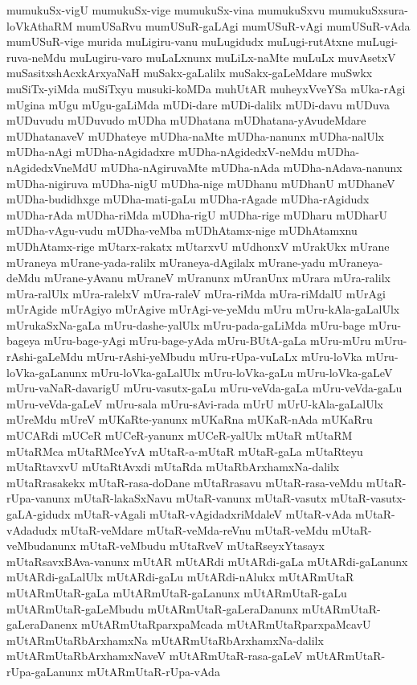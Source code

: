 {mumukuSx-vigU
mumukuSx-vige
mumukuSx-vina
mumukuSxvu
mumukuSxsura-loVkAthaRM
mumUSaRvu
mumUSuR-gaLAgi
mumUSuR-vAgi
mumUSuR-vAda
mumUSuR-vige
murida
muLigiru-vanu
muLugidudx
muLugi-rutAtxne
muLugi-ruva-neMdu
muLugiru-varo
muLaLxnunx
muLiLx-naMte
muLuLx
muvAsetxV
muSasitxshAcxkArxyaNaH
muSakx-gaLalilx
muSakx-gaLeMdare
muSwkx
muSiTx-yiMda
muSiTxyu
musuki-koMDa
muhUtAR
muheyxVveYSa
mUka-rAgi
mUgina
mUgu
mUgu-gaLiMda
mUDi-dare
mUDi-dalilx
mUDi-davu
mUDuva
mUDuvudu
mUDuvudo
mUDha
mUDhatana
mUDhatana-yAvudeMdare
mUDhatanaveV
mUDhateye
mUDha-naMte
mUDha-nanunx
mUDha-nalUlx
mUDha-nAgi
mUDha-nAgidadxre
mUDha-nAgidedxV-neMdu
mUDha-nAgidedxVneMdU
mUDha-nAgiruvaMte
mUDha-nAda
mUDha-nAdava-nanunx
mUDha-nigiruva
mUDha-nigU
mUDha-nige
mUDhanu
mUDhanU
mUDhaneV
mUDha-budidhxge
mUDha-mati-gaLu
mUDha-rAgade
mUDha-rAgidudx
mUDha-rAda
mUDha-riMda
mUDha-rigU
mUDha-rige
mUDharu
mUDharU
mUDha-vAgu-vudu
mUDha-veMba
mUDhAtamx-nige
mUDhAtamxnu
mUDhAtamx-rige
mUtarx-rakatx
mUtarxvU
mUdhonxV
mUrakUkx
mUrane
mUraneya
mUrane-yada-ralilx
mUraneya-dAgilalx
mUrane-yadu
mUraneya-deMdu
mUrane-yAvanu
mUraneV
mUranunx
mUranUnx
mUrara
mUra-ralilx
mUra-ralUlx
mUra-ralelxV
mUra-raleV
mUra-riMda
mUra-riMdalU
mUrAgi
mUrAgide
mUrAgiyo
mUrAgive
mUrAgi-ve-yeMdu
mUru
mUru-kAla-gaLalUlx
mUrukaSxNa-gaLa
mUru-dashe-yalUlx
mUru-pada-gaLiMda
mUru-bage
mUru-bageya
mUru-bage-yAgi
mUru-bage-yAda
mUru-BUtA-gaLa
mUru-mUru
mUru-rAshi-gaLeMdu
mUru-rAshi-yeMbudu
mUru-rUpa-vuLaLx
mUru-loVka
mUru-loVka-gaLanunx
mUru-loVka-gaLalUlx
mUru-loVka-gaLu
mUru-loVka-gaLeV
mUru-vaNaR-davarigU
mUru-vasutx-gaLu
mUru-veVda-gaLa
mUru-veVda-gaLu
mUru-veVda-gaLeV
mUru-sala
mUru-sAvi-rada
mUrU
mUrU-kAla-gaLalUlx
mUreMdu
mUreV
mUKaRte-yanunx
mUKaRna
mUKaR-nAda
mUKaRru
mUCARdi
mUCeR
mUCeR-yanunx
mUCeR-yalUlx
mUtaR
mUtaRM
mUtaRMca
mUtaRMceYvA
mUtaR-a-mUtaR
mUtaR-gaLa
mUtaRteyu
mUtaRtavxvU
mUtaRtAvxdi
mUtaRda
mUtaRbArxhamxNa-dalilx
mUtaRrasakekx
mUtaR-rasa-doDane
mUtaRrasavu
mUtaR-rasa-veMdu
mUtaR-rUpa-vanunx
mUtaR-lakaSxNavu
mUtaR-vanunx
mUtaR-vasutx
mUtaR-vasutx-gaLA-gidudx
mUtaR-vAgali
mUtaR-vAgidadxriMdaleV
mUtaR-vAda
mUtaR-vAdadudx
mUtaR-veMdare
mUtaR-veMda-reVnu
mUtaR-veMdu
mUtaR-veMbudanunx
mUtaR-veMbudu
mUtaRveV
mUtaRseyxYtasayx
mUtaRsavxBAva-vanunx
mUtAR
mUtARdi
mUtARdi-gaLa
mUtARdi-gaLanunx
mUtARdi-gaLalUlx
mUtARdi-gaLu
mUtARdi-nAlukx
mUtARmUtaR
mUtARmUtaR-gaLa
mUtARmUtaR-gaLanunx
mUtARmUtaR-gaLu
mUtARmUtaR-gaLeMbudu
mUtARmUtaR-gaLeraDanunx
mUtARmUtaR-gaLeraDanenx
mUtARmUtaRparxpaMcada
mUtARmUtaRparxpaMcavU
mUtARmUtaRbArxhamxNa
mUtARmUtaRbArxhamxNa-dalilx
mUtARmUtaRbArxhamxNaveV
mUtARmUtaR-rasa-gaLeV
mUtARmUtaR-rUpa-gaLanunx
mUtARmUtaR-rUpa-vAda
}

